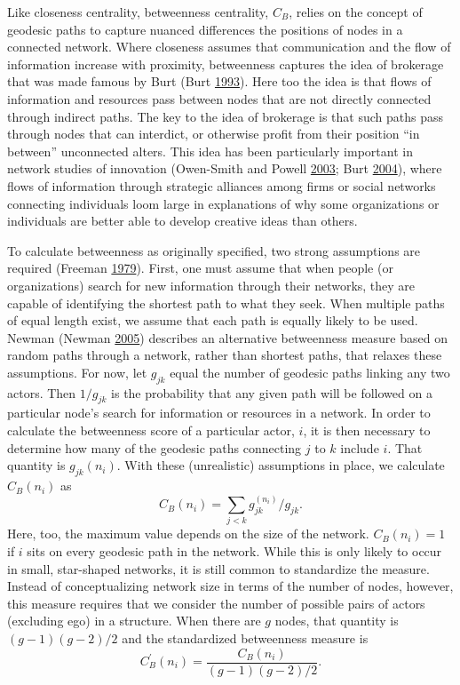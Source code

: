 \documentclass[]{krantz}
\begin{document}
Like closeness centrality, betweenness centrality, \(C_{B}\), relies on
the concept of geodesic paths to capture nuanced differences the
positions of nodes in a connected network. Where closeness assumes that
communication and the flow of information increase with proximity,
betweenness captures the idea of brokerage that was made famous by Burt
(Burt \protect\hyperlink{ref-burt1993social}{1993}). Here too the idea
is that flows of information and resources pass between nodes that are
not directly connected through indirect paths. The key to the idea of
brokerage is that such paths pass through nodes that can interdict, or
otherwise profit from their position ``in between'' unconnected alters.
This idea has been particularly important in network studies of
innovation (Owen-Smith and Powell
\protect\hyperlink{ref-owen2003expanding}{2003}; Burt
\protect\hyperlink{ref-burt2004structural}{2004}), where flows of
information through strategic alliances among firms or social networks
connecting individuals loom large in explanations of why some
organizations or individuals are better able to develop creative ideas
than others.

To calculate betweenness as originally specified, two strong assumptions
are required (Freeman
\protect\hyperlink{ref-freeman1979centrality}{1979}). First, one must
assume that when people (or organizations) search for new information
through their networks, they are capable of identifying the shortest
path to what they seek. When multiple paths of equal length exist, we
assume that each path is equally likely to be used. Newman (Newman
\protect\hyperlink{ref-newman2005measure}{2005}) describes an
alternative betweenness measure based on random paths through a network,
rather than shortest paths, that relaxes these assumptions. For now, let
\(g_{jk}\) equal the number of geodesic paths linking any two actors.
Then \(1/g_{jk}\) is the probability that any given path will be
followed on a particular node's search for information or resources in a
network. In order to calculate the betweenness score of a particular
actor, \(i\), it is then necessary to determine how many of the geodesic
paths connecting \(j\) to \(k\) include \(i\). That quantity is
\(g_{jk}(n_{i})\). With these (unrealistic) assumptions in place, we
calculate \(C_{B}(n_{i})\) as
\[C_B(n_i)=\sum_{j<k} g_{jk}^{(n_i)}/g_{jk}.\] Here, too, the maximum
value depends on the size of the network. \(C_{B}(n_{i}) = 1\) if \(i\)
sits on every geodesic path in the network. While this is only likely to
occur in small, star-shaped networks, it is still common to standardize
the measure. Instead of conceptualizing network size in terms of the
number of nodes, however, this measure requires that we consider the
number of possible pairs of actors (excluding ego) in a structure. When
there are \(g\) nodes, that quantity is \((g-1)(g-2)/2\) and the
standardized betweenness measure is
\[C_B^{\prime}(n_i)=\frac{C_B(n_i)}{(g-1)(g-2)/2}.\]
\end{document}
